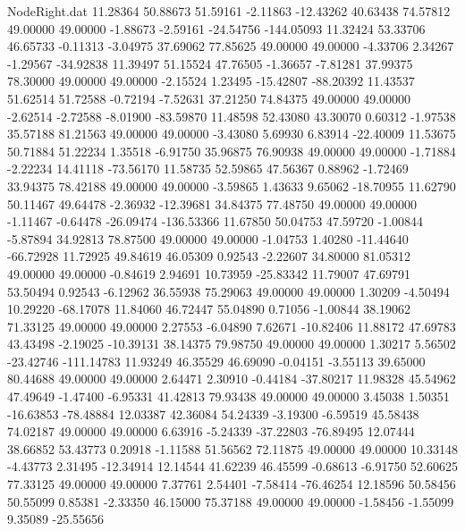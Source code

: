 \begin{filecontents}{NodeRight.dat}
  11.28364   50.88673   51.59161    -2.11863  -12.43262   40.63438   74.57812   49.00000   49.00000   -1.88673   -2.59161  -24.54756 -144.05093
  11.32424   53.33706   46.65733    -0.11313   -3.04975   37.69062   77.85625   49.00000   49.00000   -4.33706    2.34267   -1.29567  -34.92838
  11.39497   51.15524   47.76505    -1.36657   -7.81281   37.99375   78.30000   49.00000   49.00000   -2.15524    1.23495  -15.42807  -88.20392
  11.43537   51.62514   51.72588    -0.72194   -7.52631   37.21250   74.84375   49.00000   49.00000   -2.62514   -2.72588   -8.01900  -83.59870
  11.48598   52.43080   43.30070     0.60312   -1.97538   35.57188   81.21563   49.00000   49.00000   -3.43080    5.69930    6.83914  -22.40009
  11.53675   50.71884   51.22234     1.35518   -6.91750   35.96875   76.90938   49.00000   49.00000   -1.71884   -2.22234   14.41118  -73.56170
  11.58735   52.59865   47.56367     0.88962   -1.72469   33.94375   78.42188   49.00000   49.00000   -3.59865    1.43633    9.65062  -18.70955
  11.62790   50.11467   49.64478    -2.36932  -12.39681   34.84375   77.48750   49.00000   49.00000   -1.11467   -0.64478  -26.09474 -136.53366
  11.67850   50.04753   47.59720    -1.00844   -5.87894   34.92813   78.87500   49.00000   49.00000   -1.04753    1.40280  -11.44640  -66.72928
  11.72925   49.84619   46.05309     0.92543   -2.22607   34.80000   81.05312   49.00000   49.00000   -0.84619    2.94691   10.73959  -25.83342
  11.79007   47.69791   53.50494     0.92543   -6.12962   36.55938   75.29063   49.00000   49.00000    1.30209   -4.50494   10.29220  -68.17078
  11.84060   46.72447   55.04890     0.71056   -1.00844   38.19062   71.33125   49.00000   49.00000    2.27553   -6.04890    7.62671  -10.82406
  11.88172   47.69783   43.43498    -2.19025  -10.39131   38.14375   79.98750   49.00000   49.00000    1.30217    5.56502  -23.42746 -111.14783
  11.93249   46.35529   46.69090    -0.04151   -3.55113   39.65000   80.44688   49.00000   49.00000    2.64471    2.30910   -0.44184  -37.80217
  11.98328   45.54962   47.49649    -1.47400   -6.95331   41.42813   79.93438   49.00000   49.00000    3.45038    1.50351  -16.63853  -78.48884
  12.03387   42.36084   54.24339    -3.19300   -6.59519   45.58438   74.02187   49.00000   49.00000    6.63916   -5.24339  -37.22803  -76.89495
  12.07444   38.66852   53.43773     0.20918   -1.11588   51.56562   72.11875   49.00000   49.00000   10.33148   -4.43773    2.31495  -12.34914
  12.14544   41.62239   46.45599    -0.68613   -6.91750   52.60625   77.33125   49.00000   49.00000    7.37761    2.54401   -7.58414  -76.46254
  12.18596   50.58456   50.55099     0.85381   -2.33350   46.15000   75.37188   49.00000   49.00000   -1.58456   -1.55099    9.35089  -25.55656

\end{filecontents}
